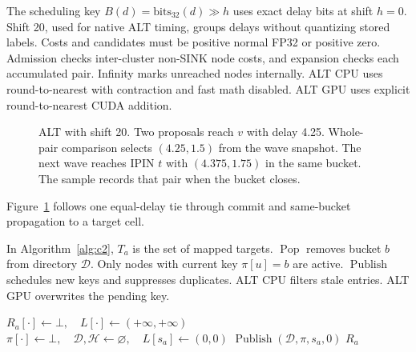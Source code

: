 The scheduling key $B(d)=\mathrm{bits}_{32}(d)\gg h$ uses exact delay bits at shift $h=0$. Shift 20, used for native ALT timing, groups delays without quantizing stored labels. Costs and candidates must be positive normal FP32 or positive zero. Admission checks inter-cluster non-SINK node costs, and expansion checks each accumulated pair. Infinity marks unreached nodes internally. ALT CPU uses round-to-nearest with contraction and fast math disabled. ALT GPU uses explicit round-to-nearest CUDA addition.

\begin{figure}[t]
\centering
{\footnotesize}
\caption{ALT with shift 20. Two proposals reach $v$ with delay 4.25. Whole-pair comparison selects $(4.25,1.5)$ from the wave snapshot. The next wave reaches IPIN $t$ with $(4.375,1.75)$ in the same bucket. The sample records that pair when the bucket closes.}\label{fig:alt_semantics}
\end{figure}
Figure~\ref{fig:alt_semantics} follows one equal-delay tie through commit and same-bucket propagation to a target cell.

In Algorithm~\ref{alg:c2}, $T_a$ is the set of mapped targets. $\operatorname{Pop}$ removes bucket $b$ from directory $\mathcal D$. Only nodes with current key $\pi[u]=b$ are active. $\operatorname{Publish}$ schedules new keys and suppresses duplicates. ALT CPU filters stale entries. ALT GPU overwrites the pending key.

\begin{algorithm}[t]\footnotesize
\caption{Whole-pair FP32 waves (C2)}\label{alg:c2}
$R_a[\cdot]\gets\bot,\quad L[\cdot]\gets(+\infty,+\infty)$\;
$\pi[\cdot]\gets\bot,\quad\mathcal D,\mathcal H\gets\varnothing,\quad L[s_a]\gets(0,0)$\;
$\operatorname{Publish}(\mathcal D,\pi,s_a,0)$\;
\Return $R_a$\;
\end{algorithm}


